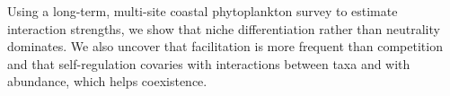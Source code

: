 \documentclass[english]{article}
\begin{document}
Using a long-term, multi-site coastal phytoplankton survey to estimate interaction strengths, we show that niche differentiation rather than neutrality dominates. We also uncover that facilitation is more frequent than competition and that self-regulation covaries with interactions between taxa and with abundance, which helps coexistence.
\end{document}
